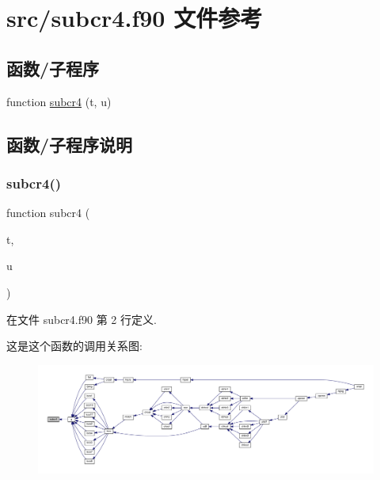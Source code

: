 \hypertarget{subcr4_8f90}{}\section{src/subcr4.f90 文件参考}
\label{subcr4_8f90}
\subsection*{函数/子程序}
\begin{DoxyCompactItemize}
\item 
function \mbox{\hyperlink{subcr4_8f90_a95909888f6128d89029b7cb03423d1b0}{subcr4}} (t, u)
\end{DoxyCompactItemize}


\subsection{函数/子程序说明}
\mbox{\label{subcr4_8f90_a95909888f6128d89029b7cb03423d1b0}} 
\subsubsection{\texorpdfstring{subcr4()}{subcr4()}}
{\footnotesize\ttfamily function subcr4 (\begin{DoxyParamCaption}\item[{}]{t,  }\item[{}]{u }\end{DoxyParamCaption})}



在文件 subcr4.\+f90 第 2 行定义.

这是这个函数的调用关系图\+:
\nopagebreak
\begin{figure}[H]
\begin{center}
\leavevmode
\includegraphics[width=350pt]{subcr4_8f90_a95909888f6128d89029b7cb03423d1b0_icgraph}
\end{center}
\end{figure}

